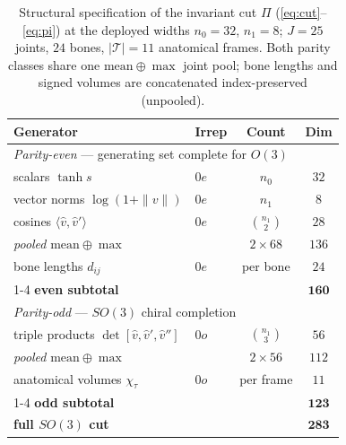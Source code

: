 \documentclass[10pt,journal]{IEEEtran}
\begin{document}
\begin{table}[!t]
\centering
\caption{Structural specification of the invariant cut $\Pi$ (\eqref{eq:cut}--\eqref{eq:pi}) at the
deployed widths $n_0=32$, $n_1=8$; $J=25$ joints, $24$ bones, $|\mathcal{T}|=11$ anatomical frames.
Both parity classes share one $\mathrm{mean}\oplus\max$ joint pool; bone lengths and signed volumes
are concatenated index-preserved (unpooled).}
\label{tab:invsets}
\footnotesize
\setlength{\tabcolsep}{4pt}
\begin{tabular}{llcc}
\toprule
Generator & Irrep & Count & Dim \\
\midrule
\multicolumn{4}{l}{\emph{Parity-even} --- generating set complete for $O(3)$}\\
\quad scalars $\tanh s$                      & $0e$ & $n_0$            & $32$ \\
\quad vector norms $\log(1{+}\|v\|)$         & $0e$ & $n_1$            & $8$ \\
\quad cosines $\langle\hat v,\hat v'\rangle$ & $0e$ & $\binom{n_1}{2}$ & $28$ \\
\quad\emph{pooled} $\mathrm{mean}\oplus\max$ &      & $2\times68$      & $136$ \\
\quad bone lengths $d_{ij}$                  & $0e$ & per bone         & $24$ \\
\cmidrule(lr){1-4}
\quad\textbf{even subtotal}                  &      &                  & $\mathbf{160}$ \\
\midrule
\multicolumn{4}{l}{\emph{Parity-odd} --- $SO(3)$ chiral completion}\\
\quad triple products $\det[\hat v,\hat v',\hat v'']$ & $0o$ & $\binom{n_1}{3}$ & $56$ \\
\quad\emph{pooled} $\mathrm{mean}\oplus\max$ &      & $2\times56$      & $112$ \\
\quad anatomical volumes $\chi_\tau$         & $0o$ & per frame        & $11$ \\
\cmidrule(lr){1-4}
\quad\textbf{odd subtotal}                   &      &                  & $\mathbf{123}$ \\
\midrule
\quad\textbf{full $SO(3)$ cut}               &      &                  & $\mathbf{283}$ \\
\bottomrule
\end{tabular}
\end{table}
\end{document}
